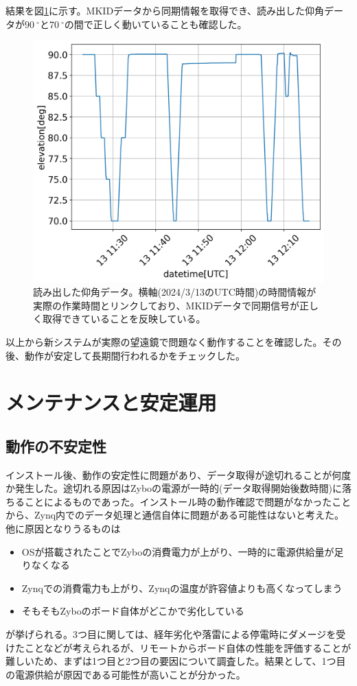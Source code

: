 結果を図\ref{elevation_data}に示す。MKIDデータから同期情報を取得でき、読み出した仰角データが$\SI{90}{^{\circ}}$と$\SI{70}{^{\circ}}$の間で正しく動いていることも確認した。

\begin{figure}[htbp]
  \centering
  \includegraphics[width=0.8\columnwidth]{4_elDAQ/figs/elevation_data.png}
  \caption{読み出した仰角データ。横軸(2024/3/13のUTC時間)の時間情報が実際の作業時間とリンクしており、MKIDデータで同期信号が正しく取得できていることを反映している。}
  \label{elevation_data}
\end{figure}

以上から新システムが実際の望遠鏡で問題なく動作することを確認した。その後、動作が安定して長期間行われるかをチェックした。

\section{メンテナンスと安定運用}

\subsection{動作の不安定性}
インストール後、動作の安定性に問題があり、データ取得が途切れることが何度か発生した。途切れる原因はZyboの電源が一時的(データ取得開始後数時間)に落ちることによるものであった。インストール時の動作確認で問題がなかったことから、Zynq内でのデータ処理と通信自体に問題がある可能性はないと考えた。他に原因となりうるものは
\begin{itemize}
  \item OSが搭載されたことでZyboの消費電力が上がり、一時的に電源供給量が足りなくなる
  \item Zynqでの消費電力も上がり、Zynqの温度が許容値よりも高くなってしまう
  \item そもそもZyboのボード自体がどこかで劣化している
\end{itemize}
が挙げられる。3つ目に関しては、経年劣化や落雷による停電時にダメージを受けたことなどが考えられるが、リモートからボード自体の性能を評価することが難しいため、まずは1つ目と2つ目の要因について調査した。結果として、1つ目の電源供給が原因である可能性が高いことが分かった。


